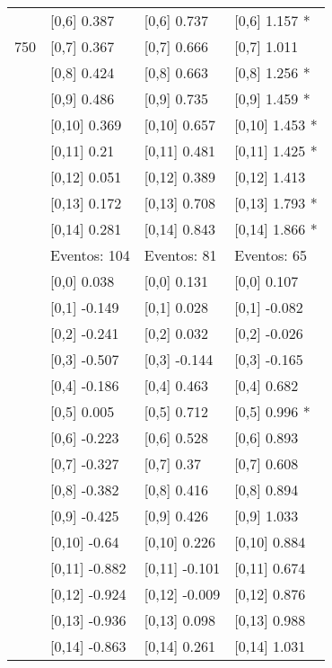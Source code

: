 \begin{table}
\begin{tabular}[t]{llll}
 & {}[0,6] 0.387 & {}[0,6] 0.737 & {}[0,6] 1.157 *\\
750 & {}[0,7] 0.367 & {}[0,7] 0.666 & {}[0,7] 1.011\\
\addlinespace
 & {}[0,8] 0.424 & {}[0,8] 0.663 & {}[0,8] 1.256 *\\
 & {}[0,9] 0.486 & {}[0,9] 0.735 & {}[0,9] 1.459 *\\
 & {}[0,10] 0.369 & {}[0,10] 0.657 & {}[0,10] 1.453 *\\
 & {}[0,11] 0.21 & {}[0,11] 0.481 & {}[0,11] 1.425 *\\
 & {}[0,12] 0.051 & {}[0,12] 0.389 & {}[0,12] 1.413\\
\addlinespace
 & {}[0,13] 0.172 & {}[0,13] 0.708 & {}[0,13] 1.793 *\\
 & {}[0,14] 0.281 & {}[0,14] 0.843 & {}[0,14] 1.866 *\\
 & Eventos:  104 & Eventos:  81 & Eventos:  65\\
 & {}[0,0] 0.038 & {}[0,0] 0.131 & {}[0,0] 0.107\\
 & {}[0,1] -0.149 & {}[0,1] 0.028 & {}[0,1] -0.082\\
\addlinespace
 & {}[0,2] -0.241 & {}[0,2] 0.032 & {}[0,2] -0.026\\
 & {}[0,3] -0.507 & {}[0,3] -0.144 & {}[0,3] -0.165\\
 & {}[0,4] -0.186 & {}[0,4] 0.463 & {}[0,4] 0.682\\
 & {}[0,5] 0.005 & {}[0,5] 0.712 & {}[0,5] 0.996 *\\
 & {}[0,6] -0.223 & {}[0,6] 0.528 & {}[0,6] 0.893\\
\addlinespace
1000 & {}[0,7] -0.327 & {}[0,7] 0.37 & {}[0,7] 0.608\\
 & {}[0,8] -0.382 & {}[0,8] 0.416 & {}[0,8] 0.894\\
 & {}[0,9] -0.425 & {}[0,9] 0.426 & {}[0,9] 1.033\\
 & {}[0,10] -0.64 & {}[0,10] 0.226 & {}[0,10] 0.884\\
 & {}[0,11] -0.882 & {}[0,11] -0.101 & {}[0,11] 0.674\\
\addlinespace
 & {}[0,12] -0.924 & {}[0,12] -0.009 & {}[0,12] 0.876\\
 & {}[0,13] -0.936 & {}[0,13] 0.098 & {}[0,13] 0.988\\
 & {}[0,14] -0.863 & {}[0,14] 0.261 & {}[0,14] 1.031\\
\bottomrule
\end{tabular}
\end{table}
